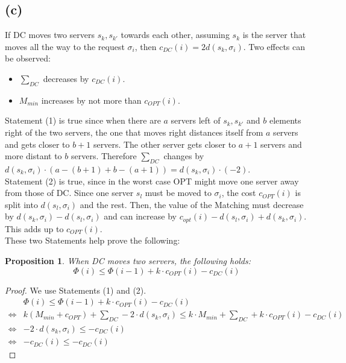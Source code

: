 \documentclass[a4paper,12pt]{scrartcl}
\newcommand{\eq}{\ensuremath{\Leftrightarrow}}
\newcommand{\mal}{\ensuremath{\cdot}}
\newcounter{sheet}
\newtheorem{proposition}{Proposition}[sheet]
\begin{document}
\subsection*{(c)}
If DC moves two servers $s_k,s_{k'}$ towards each other, assuming $s_k$ is the server that moves all the way to the request $\sigma_i$, then $c_{DC}(i) = 2d(s_k,\sigma_i)$.
Two effects can be observed:
\begin{itemize}
\item[(1)] $\sum_{DC}$ decreases by $c_{DC}(i)$.
\item[(2)] $M_{min}$ increases by not more than $c_{OPT}(i)$.
\end{itemize}
Statement (1) is true since when there are $a$ servers left of $s_k,s_{k'}$ and $b$ elements right of the two servers, the one that moves right distances itself from $a$ servers and gets closer to $b+1$ servers. The other server gets closer to $a+1$ servers and more distant to $b$ servers. Therefore $\sum_{DC}$ changes by $d(s_k,\sigma_i) \cdot (a - (b+1) + b - (a+1)) = d(s_k,\sigma_i) \cdot (-2)$. \\
Statement (2) is true, since in the worst case OPT might move one server away from those of DC. Since one server $s_l$ must be moved to $\sigma_i$, the cost $c_{OPT}(i)$ is split into $d(s_l,\sigma_i)$ and the rest. Then, the value of the Matching must decrease by $d(s_k,\sigma_i) - d(s_l,\sigma_i)$ and can increase by $c_{opt}(i) - d(s_l,\sigma_i) + d(s_k,\sigma_i)$. This adds up to $c_{OPT}(i)$. \\
These two Statements help prove the following:
\begin{proposition}
When DC moves two servers, the following holds:
\[\Phi(i) \leq \Phi(i-1) + k \cdot c_{OPT}(i) - c_{DC}(i)\]
\end{proposition}
\begin{proof}
We use Statements (1) and (2).
\begin{align*}
& \Phi(i) \leq \Phi(i-1) + k \cdot c_{OPT}(i) - c_{DC}(i) \\
\Leftrightarrow & k(M_{min} + c_{OPT}) + \sum_{DC} - 2\cdot d(s_k,\sigma_i) \leq k \cdot M_{min} + \sum_{DC} + k \cdot c_{OPT}(i) - c_{DC}(i) \\
\Leftrightarrow & -2 \mal d(s_k,\sigma_i) \leq - c_{DC}(i) \\
\eq & -c_{DC}(i) \leq -c_{DC}(i)
\end{align*} \end{proof}
\pagebreak
\end{document}
